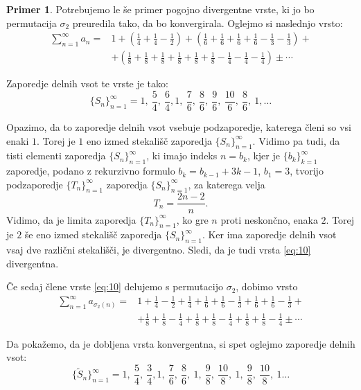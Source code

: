 \documentclass[12pt,a4paper,reqno]{amsart}
\theoremstyle{definition} %
\newtheorem{primer}[definicija]{Primer}
\theoremstyle{plain} %
\begin{document}
\begin{primer}
Potrebujemo le še primer pogojno divergentne vrste, ki jo bo permutacija $\sigma_2$ preuredila tako, da bo konvergirala. Oglejmo si naslednjo vrsto:
\begin{align}\label{eq:10}
\sum_{n=1}^{\infty}a_n=&1 + \left(\frac{1}{4}+\frac{1}{4}-\frac{1}{2} \right) + \left(\frac{1}{6}+\frac{1}{6}+\frac{1}{6}+\frac{1}{6}-\frac{1}{3}-\frac{1}{3} \right)+ \nonumber \\
&+\left(\frac{1}{8}+\frac{1}{8}+\frac{1}{8}+\frac{1}{8}+\frac{1}{8}+\frac{1}{8}-\frac{1}{4}-\frac{1}{4}-\frac{1}{4}\right) \pm \cdots
\end{align}

Zaporedje delnih vsot te vrste je tako:
$$\{S_n\}_{n=1}^{\infty}= 1,\ \frac{5}{4}, \ \frac{6}{4}, 1, \ \frac{7}{6}, \ \frac{8}{6}, \ \frac{9}{6}, \ \frac{10}{6}, \ \frac{8}{6}, \ 1, \ldots$$

Opazimo, da to zaporedje delnih vsot vsebuje podzaporedje, katerega členi so vsi enaki $1$. Torej je $1$ eno izmed stekališč zaporedja $\{S_n\}_{n=1}^{\infty}$. Vidimo pa tudi, da tisti elementi zaporedja $\{S_n\}_{n=1}^{\infty}$, ki imajo indeks $n=b_k$, kjer je $\{b_k\}_{k=1}^{\infty}$ zaporedje, podano z rekurzivno formulo $b_k=b_{k-1}+3 k-1$, $b_1=3$, tvorijo podzaporedje $\{T_n\}_{n=1}^{\infty}$ zaporedja $\{S_n\}_{n=1}^{\infty}$, za katerega velja $$T_n = \frac{2 n-2}{n}.$$ Vidimo, da je limita zaporedja $\{T_n\}_{n=1}^{\infty}$, ko gre $n$ proti neskončno, enaka $2$. Torej je $2$ še eno izmed stekališč zaporedja $\{S_n\}_{n=1}^{\infty}$. Ker ima zaporedje delnih vsot vsaj dve različni stekališči, je divergentno. Sledi, da je tudi vrsta \eqref{eq:10} divergentna.

Če sedaj člene vrste \eqref{eq:10} delujemo s permutacijo $\sigma_2$, dobimo vrsto
\begin{align}\label{eq:11}
\sum_{n=1}^{\infty}a_{\sigma_2(n)}=&1+\frac{1}{4}-\frac{1}{2}+\frac{1}{4}+\frac{1}{6}+\frac{1}{6}-\frac{1}{3}+\frac{1}{6}+\frac{1}{6}-\frac{1}{3}+ \nonumber \\
&+\frac{1}{8}+\frac{1}{8}-\frac{1}{4}+\frac{1}{8}+\frac{1}{8}-\frac{1}{4}+\frac{1}{8}+\frac{1}{8}-\frac{1}{4} \pm \cdots
\end{align}

Da pokažemo, da je dobljena vrsta konvergentna, si spet oglejmo zaporedje delnih vsot:
$$\{\tilde{S}_n\}_{n=1}^{\infty}= 1,\ \frac{5}{4}, \ \frac{3}{4}, 1, \ \frac{7}{6}, \ \frac{8}{6}, \ 1, \ \frac{9}{8}, \ \frac{10}{8}, \ 1,  \ \frac{9}{8}, \ \frac{10}{8}, \ 1 \ldots$$


\end{primer}
\end{document}
